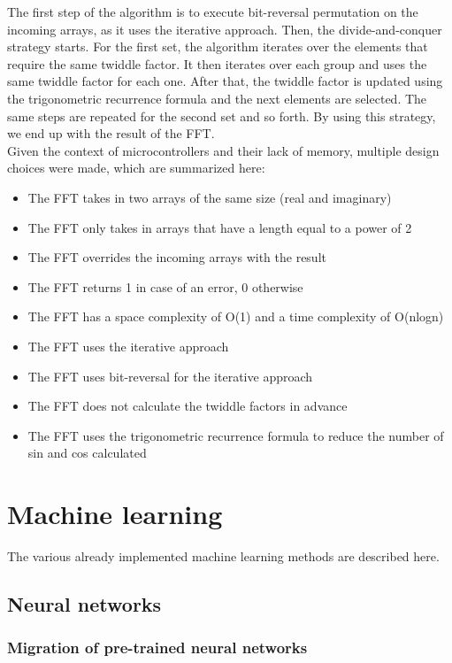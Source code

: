 \documentclass{book}
\begin{document}
The first step of the algorithm is to execute bit-reversal permutation on the incoming arrays, as it uses the iterative approach. Then, the divide-and-conquer strategy starts. For the first set, the algorithm iterates over the elements that require the same twiddle factor. It then iterates over each group and uses the same twiddle factor for each one. After that, the twiddle factor is updated using the trigonometric recurrence formula and the next elements are selected. The same steps are repeated for the second set and so forth. By using this strategy, we end up with the result of the FFT.\\


Given the context of microcontrollers and their lack of memory, multiple design choices were made, which are summarized here:
\begin{itemize}
	\item The FFT takes in two arrays of the same size (real and imaginary)
	\item The FFT only takes in arrays that have a length equal to a power of 2
	\item The FFT overrides the incoming arrays with the result
	\item The FFT returns 1 in case of an error, 0 otherwise
	\item The FFT has a space complexity of O(1) and a time complexity of O(nlogn)
	\item The FFT uses the iterative approach
	\item The FFT uses bit-reversal for the iterative approach
	\item The FFT does not calculate the twiddle factors in advance
	\item The FFT uses the trigonometric recurrence formula to reduce the number of sin and cos calculated
\end{itemize}


\chapter{Machine learning}

The various already implemented machine learning methods are described here.

\section{Neural networks}

\subsection{Migration of pre-trained neural networks}
\end{document}

